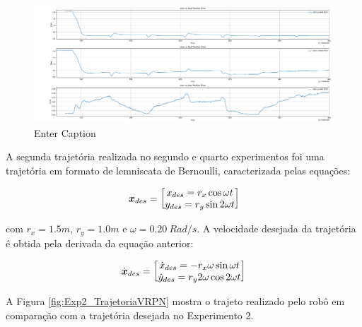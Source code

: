 \begin{figure}
    \centering
    \includegraphics[width=1\linewidth]{img/Resultados/Exp1_VRPN_Control_LINEAR/Erros.pdf}
    \caption{Enter Caption}
    \label{fig:Exp1_Erros}
\end{figure}

A segunda trajetória realizada no segundo e quarto experimentos foi uma trajetória em formato de lemniscata de Bernoulli, caracterizada pelas equações:

\begin{equation}
    \boldsymbol{x}_{des}=\begin{bmatrix} x_{des}=r_x\cos{\omega t} \\ y_{des}=r_y\sin{2 \omega t} \end{bmatrix}
\end{equation}

com $r_x = 1.5m$, $r_y = 1.0m$ e $\omega = 0.20\ Rad/s$. A velocidade desejada da trajetória é obtida pela derivada da equação anterior:

\begin{equation}
    \dot{\boldsymbol{x}}_{des}=\begin{bmatrix} \dot{x}_{des} = -r_x \omega \sin{\omega t} \\
    \dot{y}_{des}=r_y 2\omega\cos{2 \omega t} \end{bmatrix}
\end{equation}

A Figura \ref{fig:Exp2_TrajetoriaVRPN} mostra o trajeto realizado pelo robô em comparação com a trajetória desejada no Experimento 2.


